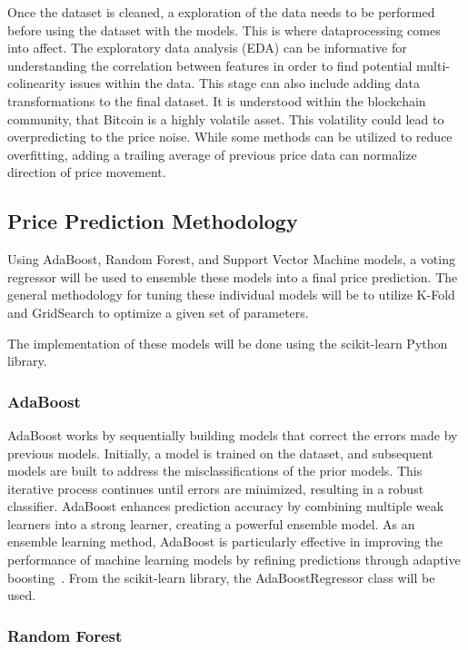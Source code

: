 Once the dataset is cleaned, a exploration of the data needs to be performed before using the dataset with
the models. This is where dataprocessing comes into affect. The exploratory data analysis (EDA) can be
informative for understanding the correlation between features in order to find potential multi-colinearity
issues within the data. This stage can also include adding data transformations to the final dataset. It is
understood within the blockchain community, that Bitcoin is a highly volatile asset. This volatility could
lead to overpredicting to the price noise. While some methods can be utilized to reduce overfitting, adding
a trailing average of previous price data can normalize direction of price movement.

\subsection{Price Prediction Methodology}\label{subsec:price_prediction_methodology}

Using AdaBoost, Random Forest, and Support Vector Machine models, a voting regressor will be used
to ensemble these models into a final price prediction. The general methodology for tuning these
individual models will be to utilize K-Fold and GridSearch to optimize a given set of parameters.

The implementation of these models will be done using the scikit-learn Python library.

\subsubsection{AdaBoost}\label{subsubsec:adaboost}

AdaBoost works by sequentially building models that correct the
errors made by previous models. Initially, a model is trained on the dataset, and subsequent models are built to address
the misclassifications of the prior models. This iterative process continues until errors are minimized, resulting in a
robust classifier. AdaBoost enhances prediction accuracy by combining multiple weak learners into a strong learner,
creating a powerful ensemble model. As an ensemble learning method, AdaBoost is particularly effective in improving the
performance of machine learning models by refining predictions through adaptive boosting\ \cite{adaBoostAnalyticsVidhya}.
From the scikit-learn library, the AdaBoostRegressor class will be used.

\subsubsection{Random Forest}\label{subsubsec:randomforest}

